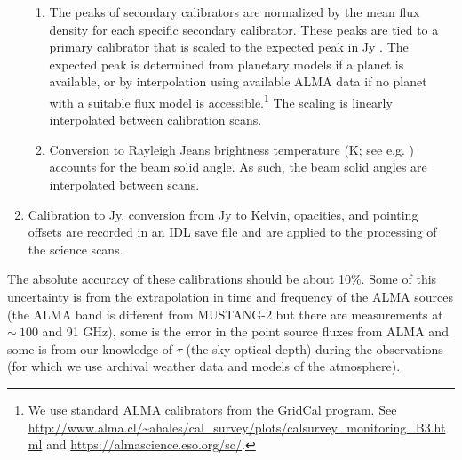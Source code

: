\documentclass[twocolumn]{aastex62}
\def\todo#1{{\textcolor{red}{TODO: #1}}}
\newcommand{\MUSTANG}{MUSTANG-2\xspace}
\begin{document}
\begin{enumerate}
        \begin{enumerate}
            \item The peaks of secondary calibrators are normalized by the mean flux density
                for each specific secondary calibrator. These peaks are tied
                to a primary calibrator that is scaled to the expected
                peak in Jy \perbeam.  The expected peak is determined from
                planetary models if a planet is available, or by interpolation using available ALMA data \citep{vanKempen2014,Fomalont2014}
                if no planet with a suitable flux model is accessible.\footnote{We use
                standard ALMA calibrators from the GridCal program.  See
                \url{http://www.alma.cl/~ahales/cal_survey/plots/calsurvey_monitoring_B3.html} and 
                \url{https://almascience.eso.org/sc/}.}
                The scaling is
                linearly interpolated between calibration scans.
            \item Conversion to Rayleigh Jeans brightness temperature (K; see e.g. \citealt{Condon2016a}) accounts for the beam solid angle. As such,
                the beam solid angles are interpolated between scans.
        \end{enumerate}
    \item Calibration to Jy, conversion from Jy \perbeam to Kelvin, opacities,
        and pointing offsets are recorded in an IDL save file and are
        applied to the processing of the science scans.
\end{enumerate}

The absolute accuracy of these calibrations should be about 10\%.
Some of this uncertainty is from the extrapolation in time and frequency of the ALMA
sources (the ALMA band is different from \MUSTANG but there are measurements at
$\sim~100$ and 91 GHz), some is the error in the point source fluxes from ALMA and
some is from our knowledge of $\tau$ (the sky optical depth) during the observations (for which we use archival weather data and models of the atmosphere). 
\end{document}
